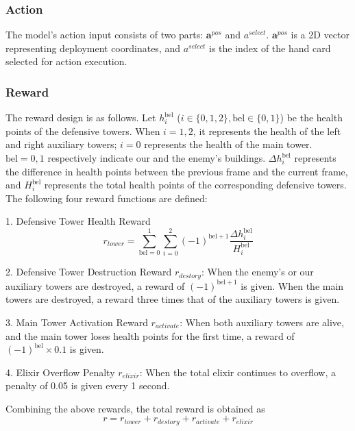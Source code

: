 \documentclass[runningheads]{llncs}
\def\bd{\boldsymbol}        %
\begin{document}
\subsubsection{Action}
The model's action input consists of two parts:
$\bd{a}^{pos}$ and $a^{select}$. $\bd{a}^{pos}$ is a 2D vector representing deployment coordinates,
and $a^{select}$ is the index of the hand card selected for action execution.
\subsubsection{Reward}\label{sec-reward}
The reward design is as follows. Let $h_{i}^{\text{bel}}$ ($i \in \{0,1,2\}, \text{bel} \in \{0,1\}$) be the health points of the defensive towers. When $i=1,2$, it represents the health of the left and right auxiliary towers; $i=0$ represents the health of the main tower. $\text{bel}=0,1$ respectively indicate our and the enemy's buildings. $\Delta h_{i}^{\text{bel}}$ represents the difference in health points between the previous frame and the current frame, and $H_{i}^{\text{bel}}$ represents the total health points of the corresponding defensive towers. The following four reward functions are defined:

1. Defensive Tower Health Reward
\begin{equation}
  r_{tower} = \sum_{\text{bel}=0}^1\sum_{i=0}^2(-1)^{\text{bel}+1}\frac{\Delta h_{i}^{\text{bel}}}{H_{i}^{\text{bel}}}
\end{equation}

2. Defensive Tower Destruction Reward $r_{destory}$: When the enemy's or our auxiliary towers are destroyed, a reward of $(-1)^{\text{bel}+1}$ is given. When the main towers are destroyed, a reward three times that of the auxiliary towers is given.

3. Main Tower Activation Reward $r_{activate}$: When both auxiliary towers are alive, and the main tower loses health points for the first time, a reward of $(-1)^{\text{bel}} \times 0.1$ is given.

4. Elixir Overflow Penalty $r_{elixir}$: When the total elixir continues to overflow, a penalty of 0.05 is given every 1 second.

Combining the above rewards, the total reward is obtained as
\begin{equation}\label{eq-reward}
  r = r_{tower} + r_{destory} + r_{activate} + r_{elixir}
\end{equation}
\end{document}
